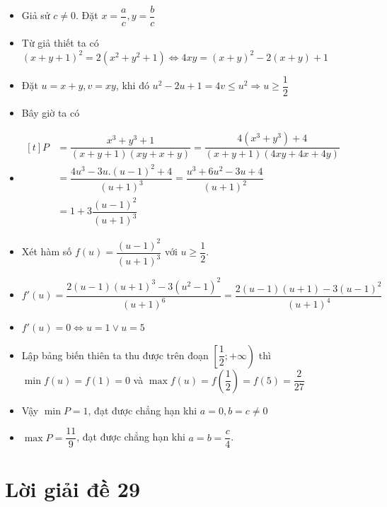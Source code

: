 \lgi 
\begin{itemize}[label=,leftmargin=*]
\item Giả sử $c\ne 0$. Đặt $x=\dfrac{a}{c},y=\dfrac{b}{c}$
\item Từ giả thiết ta có $(x+y+1)^2=2(x^2+y^2+1)\Leftrightarrow 4xy=(x+y)^2-2(x+y)+1$
\item Đặt $u=x+y,v=xy$, khi đó $u^2-2u+1=4v\le u^2 \Rightarrow u \ge \dfrac{1}{2}$
\item Bây giờ ta có 
\item $\begin{aligned}[t]P&=\dfrac{x^3+y^3+1}{(x+y+1)(	xy+x+y)}=\dfrac{4(x^3+y^3)+4}{(x+y+1)(4xy+4x+4y)}\\
&=\dfrac{4u^3-3u.(u-1)^2+4}{(u+1)^3}=\dfrac{u^3+6u^2-3u+4}{(u+1)^2} \\
&=1+3\dfrac{(u-1)^2}{(u+1)^3}\end{aligned}$
\item Xét hàm số $f(u)=\dfrac{(u-1)^2}{(u+1)^3}$ với $u\ge \dfrac{1}{2}$.
\item $f'(u)=\dfrac{2(u-1)(u+1)^3-3(u^2-1)^2}{(u+1)^6}=\dfrac{2(u-1)(u+1)-3(u-1)^2}{(u+1)^4}$
\item $f'(u)=0\Leftrightarrow u=1 \vee u=5$
\item Lập bảng biến thiên ta thu được trên đoạn $\left[\dfrac{1}{2};+\infty \right)$ thì $\min f(u)=f(1)=0$ và $\max f(u)=f\left(\dfrac{1}{2} \right)=f(5)=\dfrac{2}{27}$
\item Vậy $\min P=1$, đạt được chẳng hạn khi $a=0,b=c\ne 0$
\item $\max P=\dfrac{11}{9}$, đạt được chẳng hạn khi $a=b=\dfrac{c}{4}$.
\end{itemize}

\section{Lời giải đề 29}


